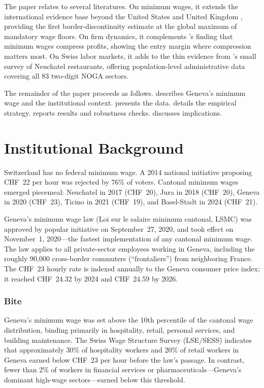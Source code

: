 \documentclass[12pt]{article}
\begin{document}
The paper relates to several literatures. On minimum wages, it extends the international evidence base beyond the United States and United Kingdom \citep{dustmann2022,harasztosi2019,machin2003}, providing the first border-discontinuity estimate at the global maximum of mandatory wage floors. On firm dynamics, it complements \citet{draca2011}'s finding that minimum wages compress profits, showing the entry margin where compression matters most. On Swiss labor markets, it adds to the thin evidence from \citet{mohring2020}'s small survey of Neuchatel restaurants, offering population-level administrative data covering all 83 two-digit NOGA sectors.

The remainder of the paper proceeds as follows.  describes Geneva's minimum wage and the institutional context.  presents the data.  details the empirical strategy.  reports results and robustness checks.  discusses implications.


\section{Institutional Background}
\label{sec:background}

Switzerland has no federal minimum wage. A 2014 national initiative proposing CHF~22 per hour was rejected by 76\% of voters. Cantonal minimum wages emerged piecemeal: Neuchatel in 2017 (CHF~20), Jura in 2018 (CHF~20), Geneva in 2020 (CHF~23), Ticino in 2021 (CHF~19), and Basel-Stadt in 2024 (CHF~21).

Geneva's minimum wage law (Loi sur le salaire minimum cantonal, LSMC) was approved by popular initiative on September~27, 2020, and took effect on November~1, 2020---the fastest implementation of any cantonal minimum wage. The law applies to all private-sector employees working in Geneva, including the roughly 90,000 cross-border commuters (``frontaliers'') from neighboring France. The CHF~23 hourly rate is indexed annually to the Geneva consumer price index; it reached CHF~24.32 by 2024 and CHF~24.59 by 2026.

\subsubsection*{Bite} Geneva's minimum wage was set above the 10th percentile of the cantonal wage distribution, binding primarily in hospitality, retail, personal services, and building maintenance. The Swiss Wage Structure Survey (LSE/SESS) indicates that approximately 30\% of hospitality workers and 20\% of retail workers in Geneva earned below CHF~23 per hour before the law's passage. In contrast, fewer than 2\% of workers in financial services or pharmaceuticals---Geneva's dominant high-wage sectors---earned below this threshold.
\end{document}
